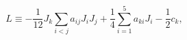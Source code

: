 \begin{equation}
L \equiv - \frac{1}{12} J_k \sum_{i<j} a_{ij} J_i J_j 
+ \frac{1}{4} \sum_{i=1}^5 a_{ki} J_i - \frac{1}{2} c_k,
\end{equation}

